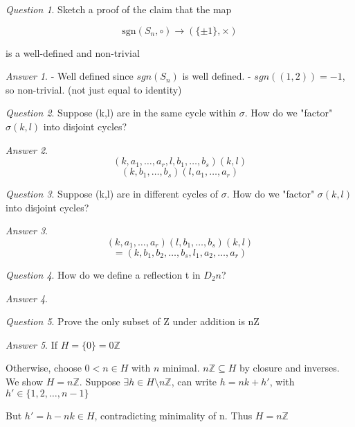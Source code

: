 \documentclass[]{article}
\theoremstyle{remark}
\theoremstyle{qnstyle}
\newtheorem{question}{Question}
\theoremstyle{answerstyle}
\newtheorem*{answer}{Answer}
\begin{document}
{
    \begin{question}
        Sketch a proof of the claim that the map

        $$\text{sgn}(S_n, \circ) \to (\{ \pm 1\}, \times)$$

        is a well-defined and non-trivial
    \end{question}
    \begin{answer}
        - Well defined since $sgn(S_n)$ is well defined.
        - $sgn((1,2)) = -1$, so non-trivial. (not just equal to identity)
    \end{answer}
}
{
    \begin{question}
        Suppose (k,l) are in the same cycle within $\sigma$. How do we "factor" $\sigma (k,l)$ into disjoint cycles?
    \end{question}
    \begin{answer}
        $$(k, a_1, \ldots, a_r,l, b_1, \ldots, b_s)(k,l)$$
        $$(k, b_1, \ldots, b_s)(l, a_1, \ldots, a_r)$$
    \end{answer}
}
{
    \begin{question}
        Suppose (k,l) are in different cycles of $\sigma$. How do we "factor" $\sigma (k,l)$ into disjoint cycles?
    \end{question}
    \begin{answer}
        $$(k, a_1, \ldots, a_r)(l, b_1, \ldots, b_s)(k, l)$$
        $$= (k, b_1, b_2, \ldots, b_s, l_1, a_2, \ldots, a_r)$$
    \end{answer}
}
{
    \begin{question}
        How do we define a reflection t in $D_2n$?
    \end{question}
    \begin{answer}
        
    \end{answer}
}
{
    \begin{question}
        Prove the only subset of Z under addition is nZ
    \end{question}
    \begin{answer}
        If $H = \{0\} = 0\mathbb{Z}$

        Otherwise, choose $0 < n \in H$ with $n$ minimal. $n\mathbb{Z} \subseteq H$ by closure and inverses. We show $H = n\mathbb{Z}$. Suppose $\exists h \in H \setminus n \mathbb{Z}$, can write $h = nk + h'$, with $h' \in \{1,2,\ldots, n-1\}$

        But $h' = h - nk \in H$, contradicting minimality of n. Thus $H = n\mathbb{Z}$
    \end{answer}
}
\end{document}
